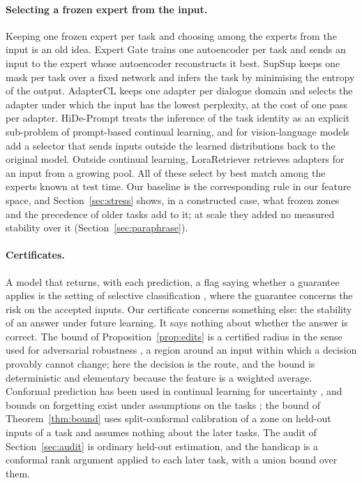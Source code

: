 \paragraph{Selecting a frozen expert from the input.} Keeping one frozen expert per task and
choosing among the experts from the input is an old idea. Expert Gate
\citep{aljundi2017expertgate} trains one autoencoder per task and sends an input to the expert whose
autoencoder reconstructs it best. SupSup \citep{wortsman2020supsup} keeps one mask per task over a
fixed network and infers the task by minimising the entropy of the output. AdapterCL
\citep{madotto2021adaptercl} keeps one adapter per dialogue domain and selects the adapter under
which the input has the lowest perplexity, at the cost of one pass per adapter. HiDe-Prompt
\citep{wang2023hide} treats the inference of the task identity as an explicit sub-problem of
prompt-based continual learning, and for vision-language models \citet{yu2024moeadapters} add a
selector that sends inputs outside the learned distributions back to the original model. Outside
continual learning, LoraRetriever \citep{zhao2024loraretriever} retrieves adapters for an input from
a growing pool. All of these select by best match among the experts known at test time. Our
\nearest{} baseline is the corresponding rule in our feature space, and Section~\ref{sec:stress}
shows, in a constructed case, what frozen zones and the precedence of older tasks add to it; at scale they added no measured stability over it (Section~\ref{sec:paraphrase}).

\paragraph{Certificates.} A model that returns, with each prediction, a flag saying whether a
guarantee applies is the setting of selective classification \citep{geifman2017selective}, where the
guarantee concerns the risk on the accepted inputs. Our certificate concerns something else: the
stability of an answer under future learning. It says nothing about whether the answer is correct.
The bound of Proposition~\ref{prop:edits} is a certified radius in the sense used for adversarial
robustness \citep{cohen2019smoothing}, a region around an input within which a decision provably
cannot change; here the decision is the route, and the bound is deterministic and elementary
because the feature is a weighted average. Conformal prediction has been used in continual learning for uncertainty \citep{gao2025conformalcl}, and bounds on forgetting exist under assumptions on the tasks \citep{friedman2024forgettingbounds}; the bound of Theorem~\ref{thm:bound} uses split-conformal calibration of a zone on held-out inputs of a task and assumes nothing about the later tasks. The audit of Section~\ref{sec:audit} is ordinary held-out estimation, and the handicap is a conformal rank argument applied to each later task, with a union bound over them.

